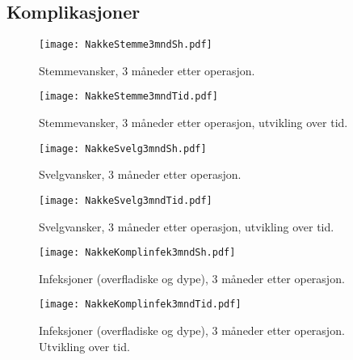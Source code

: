 \documentclass[presentation,xcolor=pdftex,dvipsnames,table]{beamer}\usepackage[]{graphicx}\usepackage[]{color}
\begin{document}
\begin{tiny}
\section{Komplikasjoner}

\begin{frame}[fragile]
\begin{figure}[ht]
\centering
\texttt{[image: NakkeStemme3mndSh.pdf]}
\caption{Stemmevansker, 3 måneder etter operasjon. }
\end{figure}
\end{frame}

\begin{frame}[fragile]
\begin{figure}[ht]
\centering
\texttt{[image: NakkeStemme3mndTid.pdf]}
\caption{Stemmevansker, 3 måneder etter operasjon, utvikling over tid. }
\end{figure}
\end{frame}

\begin{frame}[fragile]
\begin{figure}[ht]
\centering
\texttt{[image: NakkeSvelg3mndSh.pdf]}
\caption{Svelgvansker, 3 måneder etter operasjon. }
\end{figure}
\end{frame}

\begin{frame}[fragile]
\begin{figure}[ht]
\centering
\texttt{[image: NakkeSvelg3mndTid.pdf]}
\caption{Svelgvansker, 3 måneder etter operasjon, utvikling over tid. }
\end{figure}
\end{frame}


\begin{frame}[fragile]
\begin{figure}[ht]
\centering
\texttt{[image: NakkeKomplinfek3mndSh.pdf]}
\caption{Infeksjoner (overfladiske og dype), 3 måneder etter operasjon. }
\end{figure}
\end{frame}


\begin{frame}[fragile]
\begin{figure}[ht]
\centering
\texttt{[image: NakkeKomplinfek3mndTid.pdf]}
\caption{Infeksjoner (overfladiske og dype), 3 måneder etter operasjon. Utvikling over tid. }
\end{figure}
\end{frame}



\end{tiny}
\end{document}
